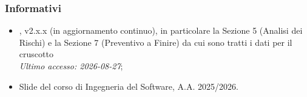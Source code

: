 \subsubsection{Informativi}
\begin{itemize}
	\item {}, v2.x.x (in aggiornamento continuo), in particolare la Sezione 5 (Analisi dei Rischi) e la Sezione 7 (Preventivo a Finire) da cui sono tratti i dati per il cruscotto \\
	\textit{Ultimo accesso: 2026-08-27};

	\item Slide del corso di Ingegneria del Software, A.A. 2025/2026.
\end{itemize}